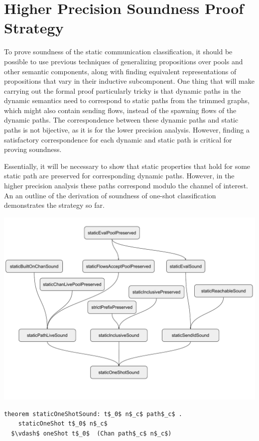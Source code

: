 \documentclass[letterpaper, 11pt]{report}
\begin{document}
\section{Higher Precision Soundness Proof Strategy}
To prove soundness of the static communication classification, it should be possible to use
previous techniques of generalizing propositions over pools and other semantic components,
along with finding equivalent representations of propositions that vary in their inductive
subcomponent. One thing that will make carrying out the formal proof particularly tricky is
that dynamic paths in the dynamic semantics need to correspond to static paths from
the trimmed graphs, which might also contain sending flows,
instead of the spawning flows of the dynamic paths.
The correspondence between these dynamic paths and static paths
is not bijective, as it is for the lower precision analysis. However, finding a satisfactory
correspondence for each dynamic and static path is critical for proving soundness.

Essentially, it will be necessary to show that static
properties that hold for some static path are preserved for corresponding dynamic paths. 
However, in the higher precision analysis these paths correspond modulo the channel of interest.
An an outline of the derivation of soundness of one-shot classification demonstrates the strategy so far.

\includegraphics[width=1\textwidth]{cml-proof-high.pdf}

\begin{lstlisting}[language=logic, mathescape]
  theorem staticOneShotSound: t$_0$ n$_c$ path$_c$ . 
    staticOneShot t$_0$ n$_c$
  $\vdash$ oneShot t$_0$  (Chan path$_c$ n$_c$)
\end{lstlisting}
\end{document}
